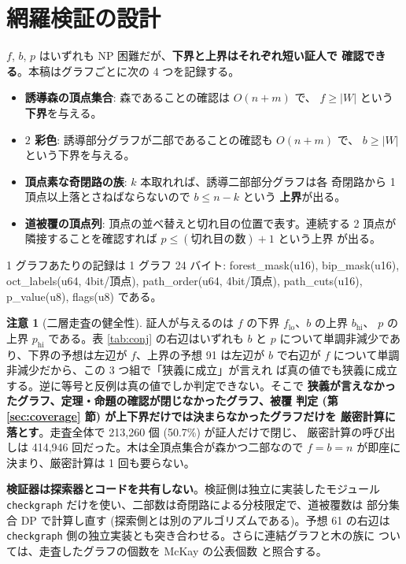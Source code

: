 \documentclass[paper=a4,fontsize=10.5pt,jafontsize=10.5pt]{jlreq}
\theoremstyle{plain}
\theoremstyle{definition}
\newtheorem{remark}[theorem]{注意}
\begin{document}
\section{網羅検証の設計}\label{sec:design}

$f$, $b$, $p$ はいずれも NP 困難だが、\textbf{下界と上界はそれぞれ短い証人で
確認できる}。本稿はグラフごとに次の 4 つを記録する。

\begin{itemize}
\item \textbf{誘導森の頂点集合}: 森であることの確認は $O(n+m)$ で、
  $f \ge |W|$ という\textbf{下界}を与える。
\item \textbf{$2$ 彩色}: 誘導部分グラフが二部であることの確認も $O(n+m)$ で、
  $b \ge |W|$ という下界を与える。
\item \textbf{頂点素な奇閉路の族}: $k$ 本取れれば、誘導二部部分グラフは各
  奇閉路から 1 頂点以上落とさねばならないので $b \le n - k$ という
  \textbf{上界}が出る。
\item \textbf{道被覆の頂点列}: 頂点の並べ替えと切れ目の位置で表す。連続する
  2 頂点が隣接することを確認すれば $p \le (\text{切れ目の数}) + 1$ という上界
  が出る。
\end{itemize}

1 グラフあたりの記録は 1 グラフ 24 バイト: forest\_mask(u16), bip\_mask(u16), oct\_labels(u64, 4bit/頂点), path\_order(u64, 4bit/頂点), path\_cuts(u16), p\_value(u8), flags(u8) である。

\begin{remark}[二層走査の健全性]\label{rem:twotier}
証人が与えるのは $f$ の下界 $f_{\mathrm{lo}}$、$b$ の上界 $b_{\mathrm{hi}}$、
$p$ の上界 $p_{\mathrm{hi}}$ である。表 \ref{tab:conj} の右辺はいずれも $b$ と
$p$ について単調非減少であり、下界の予想は左辺が $f$、上界の予想 91 は左辺が
$b$ で右辺が $f$ について単調非減少だから、この 3 つ組で「狭義に成立」が言えれ
ば真の値でも狭義に成立する。逆に等号と反例は真の値でしか判定できない。そこで
\textbf{狭義が言えなかったグラフ、定理・命題の確認が閉じなかったグラフ、被覆
判定 (第 \ref{sec:coverage} 節) が上下界だけでは決まらなかったグラフだけを
厳密計算に落とす}。走査全体で 213,260 個 (50.7\%) が証人だけで閉じ、
厳密計算の呼び出しは 414,946 回だった。木は全頂点集合が森かつ二部なので
$f = b = n$ が即座に決まり、厳密計算は 1 回も要らない。
\end{remark}

\textbf{検証器は探索器とコードを共有しない}。検証側は独立に実装したモジュール
\texttt{checkgraph} だけを使い、二部数は奇閉路による分枝限定で、道被覆数は
部分集合 DP で計算し直す (探索側とは別のアルゴリズムである)。予想 61 の右辺は
\texttt{checkgraph} 側の独立実装とも突き合わせる。さらに連結グラフと木の族に
ついては、走査したグラフの個数を McKay の公表個数 \cite{mckay} と照合する。
\end{document}
